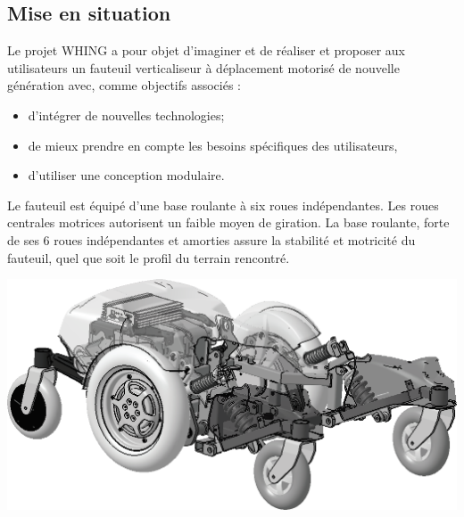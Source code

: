\documentclass[10pt,fleqn]{article} %
\begin{document}

\vspace{4.5cm}
\pagestyle{fancy}
\thispagestyle{plain}


\def\columnseprulecolor{\color{ocre}}
\setlength{\columnseprule}{0.4pt} 

\ifprof
\begin{multicols}{2}
\else
\begin{multicols}{2}
\fi
\section*{Mise en situation}
\ifprof
\else
\fi

Le projet WHING a pour objet d'imaginer et de réaliser et proposer aux utilisateurs un fauteuil verticaliseur à déplacement motorisé de nouvelle génération avec, comme objectifs associés : 
\begin{itemize}
\item d'intégrer de nouvelles technologies; 
\item de mieux prendre en compte les besoins spécifiques des utilisateurs, 
\item d'utiliser une conception modulaire. 
\end{itemize}

Le fauteuil est équipé d'une base roulante à six roues indépendantes. Les roues centrales motrices autorisent un faible moyen de giration. La base roulante, forte de ses 6 roues indépendantes et amorties assure la stabilité et motricité du fauteuil, quel que soit le profil du terrain rencontré. 


\begin{center}
\includegraphics[width=.7\linewidth]{images/fig_01}
\end{center}




\begin{obj} 


\end{obj}
\end{multicols}
\end{multicols}
\end{document}
